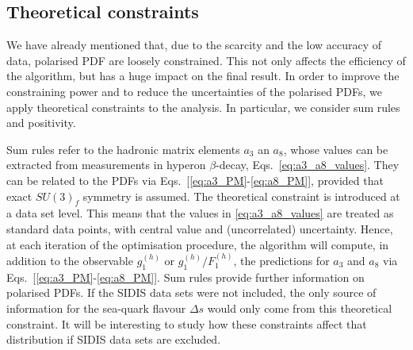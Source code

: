 \subsection*{Theoretical constraints}
We have already mentioned that, due to the scarcity and the low accuracy of data, polarised PDF are loosely constrained. This not only affects the efficiency of the algorithm, but has a huge impact on the final result. In order to improve the constraining power and to reduce the uncertainties of the polarised PDFs, we apply theoretical constraints to the analysis. In particular, we consider sum rules and positivity.%

Sum rules refer to the hadronic matrix elements $a_3$ an $a_8$, whose values can be extracted from measurements in hyperon $\beta$-decay, Eqs.~\eqref{eq:a3_a8_values}. They can be related to the PDFs via Eqs.~[\ref{eq:a3_PM}-\ref{eq:a8_PM}], provided that exact $SU(3)_f$ symmetry is assumed. The theoretical constraint is introduced at a data set level. This means that the values in \eqref{eq:a3_a8_values} are treated as standard data points, with central value and (uncorrelated) uncertainty. Hence, at each iteration of the optimisation procedure, the algorithm will compute, in addition to the observable $g_1^{(h)}$ or $g_1^{(h)}/F_1^{(h)}$, the predictions for $a_3$ and $a_8$ via Eqs.~[\ref{eq:a3_PM}-\ref{eq:a8_PM}]. Sum rules provide further information on polarised PDFs. If the SIDIS data sets were not included, the only source of information for the sea-quark flavour $\Delta s$ would only come from this theoretical constraint. It will be interesting to study how these constraints affect that distribution if SIDIS data sets are excluded.%

